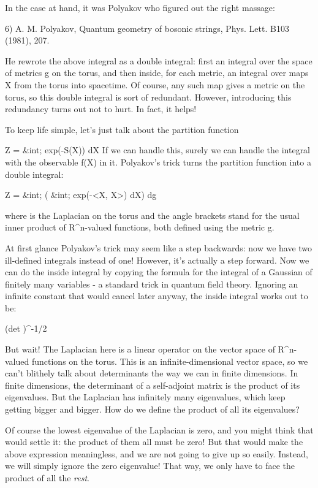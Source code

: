 In the case at hand, it was Polyakov who figured out the right massage:

6) A. M. Polyakov, Quantum geometry of bosonic strings, Phys. Lett. B103
(1981), 207.

He rewrote the above integral as a double integral: first an integral
over the space of metrics g on the torus, and then inside, for each
metric, an integral over maps X from the torus into spacetime.   Of 
course, any such map gives a metric on the torus, so this double
integral is sort of redundant.  However, introducing this redundancy
turns out not to hurt.  In fact, it helps!   

To keep life simple, let's just talk about the partition function

                     Z = &int; exp(-S(X)) dX
If we can handle this, surely we can handle the integral with the
observable f(X) in it.   Polyakov's trick turns the partition function
into a double integral:

            Z = &int; ( &int; exp(-<X, \Delta X>) dX) dg


where \Delta  is the Laplacian on the torus and the angle
brackets stand for the usual inner product of R^{n}-valued functions, both
defined using the metric g.

At first glance Polyakov's trick may seem like a step backwards: now we
have two ill-defined integrals instead of one!   However, it's actually
a step forward.  Now we can do the inside integral by copying the
formula for the integral of a Gaussian of finitely many variables - a
standard trick in quantum field theory.  Ignoring an infinite constant
that would cancel later anyway, the inside integral works out to be:

                        (det \Delta )^{-1/2}

But wait!  The Laplacian here is a linear operator on the vector space
of R^{n}-valued functions on the torus.  This is an infinite-dimensional
vector space, so we can't blithely talk about determinants the way we
can in finite dimensions.   In finite dimensions, the determinant of a
self-adjoint matrix is the product of its eigenvalues.   But the Laplacian 
has infinitely many eigenvalues, which keep getting bigger and bigger.
How do we define the product of all its eigenvalues?  

Of course the lowest eigenvalue of the Laplacian is zero, and you might
think that would settle it: the product of them all must be zero!  But
that would make the above expression meaningless, and we are not going to
give up so easily.  Instead, we will simply ignore the zero eigenvalue!
That way, we only have to face the product of all the \emph{rest}.   

